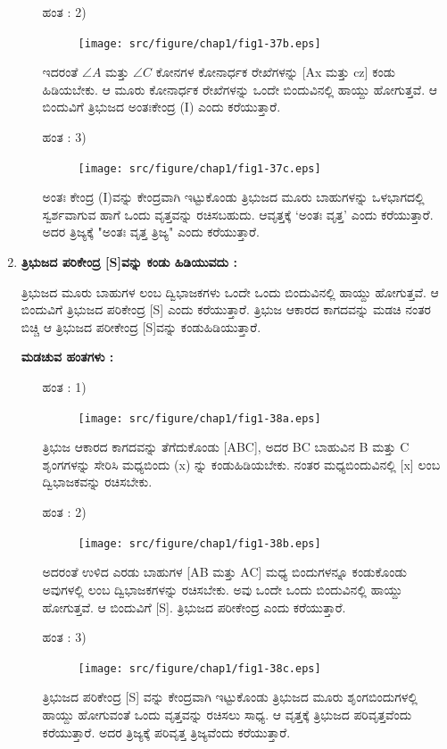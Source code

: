 \begin{enumerate}
\begin{itemize}
 \item[ಹಂತ : 2)] 
 ~
 \begin{figure}[H]
\centering
\texttt{[image: src/figure/chap1/fig1-37b.eps]}
\end{figure}
 
 
 ಇದರಂತೆ  $\angle A$ ಮತ್ತು  $\angle C$ ಕೋನಗಳ ಕೋನಾರ್ಧಕ ರೇಖೆಗಳನ್ನು [Ax ಮತ್ತು  cz] ಕಂಡು ಹಿಡಿಯಬೇಕು. ಆ ಮೂರು ಕೋನಾರ್ಧಕ ರೇಖೆಗಳನ್ನು ಒಂದೇ ಬಿಂದುವಿನಲ್ಲಿ ಹಾಯ್ದು ಹೋಗುತ್ತವೆ. ಆ ಬಿಂದುವಿಗೆ ತ್ರಿಭುಜದ ಅಂತಃಕೇಂದ್ರ  (I) ಎಂದು ಕರೆಯುತ್ತಾರೆ. 
 
  \item[ಹಂತ : 3)] 
 ~
  \begin{figure}[H]
\centering
\texttt{[image: src/figure/chap1/fig1-37c.eps]}
\end{figure}
 
 ಅಂತಃ ಕೇಂದ್ರ (I)ವನ್ನು ಕೇಂದ್ರವಾಗಿ ಇಟ್ಟುಕೊಂಡು ತ್ರಿಭುಜದ ಮೂರು ಬಾಹುಗಳನ್ನು ಒಳಭಾಗದಲ್ಲಿ ಸ್ವರ್ಶವಾಗುವ ಹಾಗೆ ಒಂದು ವೃತ್ತವನ್ನು ರಚಿಸಬಹುದು. ಆವೃತ್ತಕ್ಕೆ  `ಅಂತಃ ವೃತ್ತ' ಎಂದು ಕರೆಯುತ್ತಾರೆ. ಅದರ ತ್ರಿಜ್ಯಕ್ಕೆ "ಅಂತಃ ವೃತ್ತ ತ್ರಿಜ್ಯ" ಎಂದು ಕರೆಯುತ್ತಾರೆ. 
  \end{itemize}
  
  \item \textbf{ತ್ರಿಭುಜದ ಪರಿಕೇಂದ್ರ [S]ವನ್ನು ಕಂಡು ಹಿಡಿಯುವದು :}
  
  ತ್ರಿಭುಜದ ಮೂರು ಬಾಹುಗಳ ಲಂಬ ದ್ವಿಭಾಜಕಗಳು ಒಂದೇ ಒಂದು ಬಿಂದುವಿನಲ್ಲಿ ಹಾಯ್ದು ಹೋಗುತ್ತವೆ. ಆ ಬಿಂದುವಿಗೆ ತ್ರಿಭುಜದ ಪರಿಕೇಂದ್ರ [S] ಎಂದು ಕರೆಯುತ್ತಾರೆ. ತ್ರಿಭುಜ ಆಕಾರದ ಕಾಗದವನ್ನು ಮಡಚಿ ನಂತರ ಬಿಚ್ಚಿ ಆ ತ್ರಿಭುಜದ ಪರೀ\-ಕೇಂದ್ರ [S]ವನ್ನು ಕಂಡುಹಿಡಿಯುತ್ತಾರೆ. 
  
    \noindent
 \textbf{ಮಡಚುವ ಹಂತಗಳು :}
  \begin{itemize}
 \item[ಹಂತ : 1)] 
 ~
 \begin{figure}[H]
\centering
\texttt{[image: src/figure/chap1/fig1-38a.eps]}
\end{figure}
  
 
 ತ್ರಿಭುಜ ಆಕಾರದ ಕಾಗದವನ್ನು ತೆಗೆದುಕೊಂಡು [ABC], ಅದರ  BC ಬಾಹುವಿನ  B ಮತ್ತು C ಶೃಂಗಗಳನ್ನು ಸೇರಿಸಿ ಮಧ್ಯಬಿಂದು  (x) ನ್ನು ಕಂಡುಹಿಡಿಯಬೇಕು. ನಂತರ ಮಧ್ಯಬಿಂದುವಿನಲ್ಲಿ [x] ಲಂಬ ದ್ವಿಭಾಜಕವನ್ನು ರಚಿಸಬೇಕು.
 
 
 \item[ಹಂತ : 2)] 
 ~
 \begin{figure}[H]
\centering
\texttt{[image: src/figure/chap1/fig1-38b.eps]}
\end{figure}
 
 
 ಅದರಂತೆ ಉಳಿದ ಎರಡು ಬಾಹುಗಳ [AB ಮತ್ತು  AC] ಮಧ್ಯ ಬಿಂದುಗಳನ್ನೂ ಕಂಡುಕೊಂಡು ಅವುಗಳಲ್ಲಿ ಲಂಬ ದ್ವಿಭಾಜಕಗಳನ್ನು ರಚಿಸಬೇಕು. ಅವು ಒಂದೇ ಒಂದು ಬಿಂದುವಿನಲ್ಲಿ ಹಾಯ್ದು ಹೋಗುತ್ತವೆ. ಆ ಬಿಂದುವಿಗೆ  [S]. ತ್ರಿಭುಜದ ಪರೀಕೇಂದ್ರ ಎಂದು ಕರೆಯುತ್ತಾರೆ. 
 
 
 \item[ಹಂತ : 3)] 
 ~
 \begin{figure}[H]
\centering
\texttt{[image: src/figure/chap1/fig1-38c.eps]}
\end{figure}
   ತ್ರಿಭುಜದ ಪರಿಕೇಂದ್ರ [S] ವನ್ನು ಕೇಂದ್ರವಾಗಿ ಇಟ್ಟುಕೊಂಡು ತ್ರಿಭುಜದ ಮೂರು ಶೃಂಗಬಿಂದುಗಳಲ್ಲಿ ಹಾಯ್ದು ಹೋಗುವಂತೆ ಒಂದು ವೃತ್ತವನ್ನು ರಚಿಸಲು ಸಾಧ್ಯ. ಆ ವೃತ್ತಕ್ಕೆ ತ್ರಿಭುಜದ ಪರಿವೃತ್ತವೆಂದು ಕರೆಯುತ್ತಾರೆ. ಅದರ  ತ್ರಿಜ್ಯಕ್ಕೆ ಪರಿವೃತ್ತ  ತ್ರಿಜ್ಯವೆಂದು ಕರೆಯುತ್ತಾರೆ. 
  \end{itemize}
 \end{enumerate}

